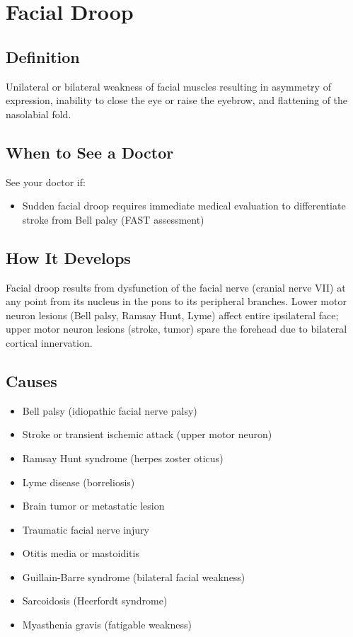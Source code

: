 \chapter{Facial Droop}

\section*{Definition}
Unilateral or bilateral weakness of facial muscles resulting in asymmetry of expression, inability to close the eye or raise the eyebrow, and flattening of the nasolabial fold.

\section*{When to See a Doctor}
See your doctor if:
\begin{itemize}
  \item Sudden facial droop requires immediate medical evaluation to differentiate stroke from Bell palsy (FAST assessment)
\end{itemize}

\section*{How It Develops}
Facial droop results from dysfunction of the facial nerve (cranial nerve VII) at any point from its nucleus in the pons to its peripheral branches. Lower motor neuron lesions (Bell palsy, Ramsay Hunt, Lyme) affect entire ipsilateral face; upper motor neuron lesions (stroke, tumor) spare the forehead due to bilateral cortical innervation.

\section*{Causes}
\begin{itemize}
  \item Bell palsy (idiopathic facial nerve palsy)
  \item Stroke or transient ischemic attack (upper motor neuron)
  \item Ramsay Hunt syndrome (herpes zoster oticus)
  \item Lyme disease (borreliosis)
  \item Brain tumor or metastatic lesion
  \item Traumatic facial nerve injury
  \item Otitis media or mastoiditis
  \item Guillain-Barre syndrome (bilateral facial weakness)
  \item Sarcoidosis (Heerfordt syndrome)
  \item Myasthenia gravis (fatigable weakness)
\end{itemize}

